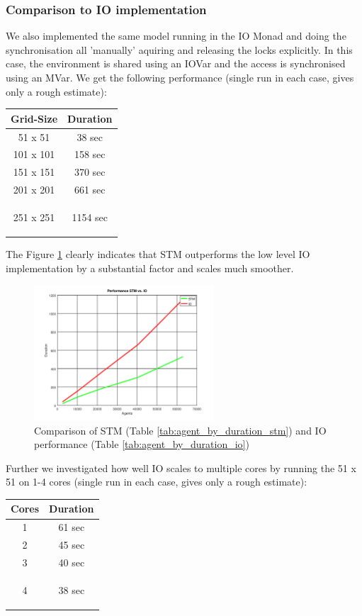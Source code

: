 \subsubsection{Comparison to IO implementation}
We also implemented the same model running in the IO Monad and doing the synchronisation all 'manually' aquiring and releasing the locks explicitly. In this case, the environment is shared using an IOVar and the access is synchronised using an MVar. We get the following performance (single run in each case, gives only a rough estimate):
\begin{center}
  \begin{tabular}{ c || c }
    Grid-Size & Duration \\ \hline \hline 
    51 x 51 & 38 sec \\ \hline
    101 x 101 & 158 sec \\ \hline
    151 x 151 & 370 sec \\ \hline
    201 x 201 & 661 sec \\ \hline
    251 x 251 & 1154 sec 
    
    \label{tab:agent_by_duration_io}
  \end{tabular}
\end{center}

The Figure \ref{fig:agent_by_duration} clearly indicates that STM outperforms the low level IO implementation by a substantial factor and scales much smoother.
\begin{figure}
	\centering
	\includegraphics[width=0.6\textwidth, angle=0]{./fig/agents_duration_stm_io.png}
	\caption{Comparison of STM (Table \ref{tab:agent_by_duration_stm}) and IO performance (Table \ref{tab:agent_by_duration_io})}
	\label{fig:agent_by_duration}
\end{figure}

Further we investigated how well IO scales to multiple cores by running the 51 x 51 on 1-4 cores (single run in each case, gives only a rough estimate):
\begin{center}
  \begin{tabular}{ c || c }
    Cores & Duration \\ \hline \hline 
    1 & 61 sec \\ \hline
    2 & 45 sec \\ \hline
    3 & 40 sec \\ \hline
    4 & 38 sec
    
    \label{tab:cores_by_duration_io}
  \end{tabular}
\end{center}

